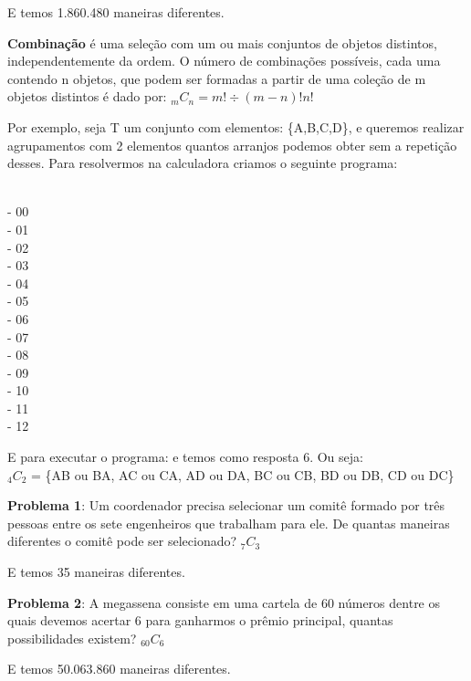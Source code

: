 E temos 1.860.480 maneiras diferentes.

\textbf{Combinação} é uma seleção com um ou mais conjuntos de objetos distintos, independentemente da ordem. O número de combinações possíveis, cada uma contendo n objetos, que podem ser formadas a partir de uma coleção de m objetos distintos é dado por: $_mC_n = m! \div (m - n)!n!$

Por exemplo, seja T um conjunto com elementos: \{A,B,C,D\}, e queremos realizar agrupamentos com 2 elementos quantos arranjos podemos obter sem a repetição desses. Para resolvermos na calculadora criamos o seguinte programa:

  \\
  - 00 \\
  - 01 \\
 - 02 \\
  - 03 \\
  - 04 \\
  - 05 \\
\keystroke{$-$} - 06 \\
  - 07 \\
  - 08 \\
  - 09 \\
\keystroke{$\times$} - 10 \\
\keystroke{$\div$} - 11 \\
    - 12 \\
 

E para executar o programa:     e temos como resposta 6. Ou seja: \\
$_4C_2$ = \{AB ou BA, AC ou CA, AD ou DA, BC ou CB, BD ou DB, CD ou DC\}

\textbf{Problema 1}: Um coordenador precisa selecionar um comitê formado por três pessoas entre os sete engenheiros que trabalham para ele. De quantas maneiras diferentes o comitê pode ser selecionado? $_7C_3$

   

E temos 35 maneiras diferentes.

\textbf{Problema 2}: A megassena consiste em uma cartela de 60 números dentre os quais devemos acertar 6 para ganharmos o prêmio principal, quantas possibilidades existem? $_60C_6$

    

E temos 50.063.860 maneiras diferentes.




